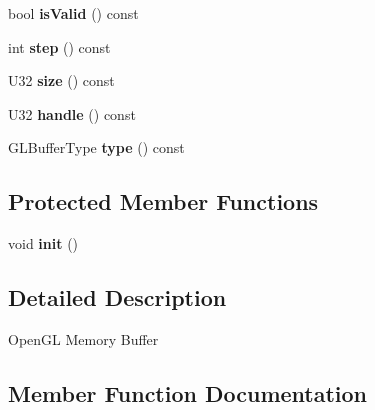 \begin{DoxyCompactItemize}
\item 
\hypertarget{classps_1_1opengl_1_1GLBuffer_a1b924a3d13f057c6ca7d6db933e6c8d9}{}bool {\bfseries is\+Valid} () const \label{classps_1_1opengl_1_1GLBuffer_a1b924a3d13f057c6ca7d6db933e6c8d9}

\item 
\hypertarget{classps_1_1opengl_1_1GLBuffer_a0e18faa846c0bfc9cda2da5121c8cd39}{}int {\bfseries step} () const \label{classps_1_1opengl_1_1GLBuffer_a0e18faa846c0bfc9cda2da5121c8cd39}

\item 
\hypertarget{classps_1_1opengl_1_1GLBuffer_aebe3201267c865d710beb8986d9e991c}{}U32 {\bfseries size} () const \label{classps_1_1opengl_1_1GLBuffer_aebe3201267c865d710beb8986d9e991c}

\item 
\hypertarget{classps_1_1opengl_1_1GLBuffer_adc8dcb0f7e428fd599b5010c7b1e8e28}{}U32 {\bfseries handle} () const \label{classps_1_1opengl_1_1GLBuffer_adc8dcb0f7e428fd599b5010c7b1e8e28}

\item 
\hypertarget{classps_1_1opengl_1_1GLBuffer_ab831ebea567f9b34967d635e1b1a606b}{}G\+L\+Buffer\+Type {\bfseries type} () const \label{classps_1_1opengl_1_1GLBuffer_ab831ebea567f9b34967d635e1b1a606b}

\end{DoxyCompactItemize}
\subsection*{Protected Member Functions}
\begin{DoxyCompactItemize}
\item 
\hypertarget{classps_1_1opengl_1_1GLBuffer_ae786850093e546eaceffe6e9e90851a6}{}void {\bfseries init} ()\label{classps_1_1opengl_1_1GLBuffer_ae786850093e546eaceffe6e9e90851a6}

\end{DoxyCompactItemize}


\subsection{Detailed Description}
Open\+G\+L Memory Buffer 

\subsection{Member Function Documentation}
\hypertarget{classps_1_1opengl_1_1GLBuffer_a0341f4338ac221c8adab5106fd6494a6}{}
